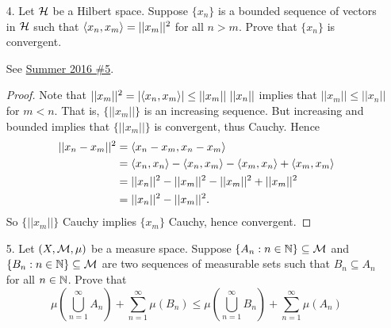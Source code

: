 \begin{itemize}
\item[4.] Let $\mathcal{H}$ be a Hilbert space. Suppose $\{x_n\}$ is a bounded sequence of
vectors in $\mathcal{H}$ such that $\langle{}x_n,x_m\rangle = ||x_m||^2$
for all $n > m$. Prove that $\{x_n\}$ is convergent.

\label{q:s16-5}
See \hyperref[q:s16-5]{Summer 2016 \#5}.

\begin{proof}
Note that $||x_m||^2 = |\langle{}x_n,x_m\rangle| \leq ||x_m|| \ ||x_n||$ implies that $||x_m|| \leq ||x_n||$ for $m < n$. That is, $\{||x_m||\}$ is an increasing sequence. But increasing and bounded implies that $\{||x_m||\}$ is convergent, thus Cauchy. Hence
\begin{align*}
    ||x_n - x_m||^2 &= \langle{}x_n - x_m,x_n - x_m\rangle \\
    &= \langle{}x_n,x_n\rangle - \langle{}x_n ,x_m\rangle - \langle{}x_m,x_n\rangle + \langle{}x_m,x_m\rangle \\ 
    &= ||x_n||^2 - ||x_m||^2 - ||x_m||^2 + ||x_m||^2 \\
    &= ||x_n||^2 - ||x_m||^2.
\end{align*}
So $\{||x_m||\}$ Cauchy implies $\{x_m\}$ Cauchy, hence convergent.
\end{proof}




\item[5.] Let $(X,\mathcal{M}, \mu)$ be a measure space. Suppose $\{A_n : n \in \mathbb{N}\} \subseteq \mathcal{M}$ and
$\{B_n : n \in \mathbb{N}\} \subseteq \mathcal{M}$ are two sequences of measurable sets such that $B_n \subseteq A_n$ for all $n \in \mathbb{N}$.
Prove that 
$$\mu(\bigcup_{n=1}^{\infty} A_n) + \sum_{n=1}^{\infty} \mu(B_n) \leq \mu(\bigcup_{n=1}^{\infty} B_n) + \sum_{n=1}^{\infty} \mu(A_n)$$


\end{itemize}
